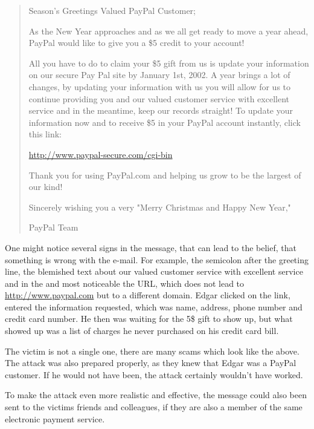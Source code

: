 \begin{quote}
Season's Greetings Valued PayPal Customer;

As the New Year approaches and as we all get ready to move a year ahead,
PayPal would like to give you a \$5 credit to your account!

All you have to do to claim your \$5 gift from us is update your information on
our secure Pay Pal site by January 1st, 2002. A year brings a lot of changes,
by updating your information with us you will allow for us to continue
providing you and our valued customer service with excellent service and in the
meantime, keep our records straight! To update your information now and to
receive \$5 in your PayPal account instantly, click this link:

\url{http://www.paypal-secure.com/cgi-bin}

Thank you for using PayPal.com and helping us grow to be the largest of our
kind!

Sincerely wishing you a very "Merry Christmas and Happy New Year,"

PayPal Team

\end{quote}

One might notice several signs in the message, that can lead to the belief,
that something is wrong with the e-mail. For example, the semicolon after the
greeting line, the blemished text about 
\glqq{}our valued customer service with excellent service and in the\grqq{} and
most noticeable the URL, which does not lead to \url{http://www.paypal.com} but
to a different domain. Edgar clicked on the link, entered the information
requested, which was name, address, phone number and credit card number. He
then was waiting for the 5\$ gift to show up, but what showed up was a list of
charges he never purchased on his credit card bill.

The victim is not a single one, there are many scams which look like the above.
The attack was also prepared properly, as they knew that Edgar was a PayPal
customer. If he would not have been, the attack certainly wouldn't have worked.

To make the attack even more realistic and effective, the message could also
been sent to the victims friends and colleagues, if they are also a member of
the same electronic payment service.


